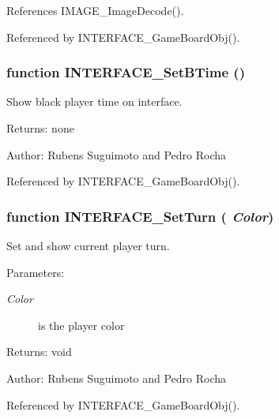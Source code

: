 References IMAGE\_\-ImageDecode().

Referenced by INTERFACE\_\-GameBoardObj().
\subsubsection[INTERFACE\_\-SetBTime]{\setlength{\rightskip}{0pt plus 5cm}function INTERFACE\_\-SetBTime ()}\label{interface_2game_8js_be79ed36e179df4bfd6a3e707bdc5ac9}


Show black player time on interface. 

\begin{Desc}
\item[Returns:]none \end{Desc}
\begin{Desc}
\item[Author:]Rubens Suguimoto and Pedro Rocha \end{Desc}


Referenced by INTERFACE\_\-GameBoardObj().
\subsubsection[INTERFACE\_\-SetTurn]{\setlength{\rightskip}{0pt plus 5cm}function INTERFACE\_\-SetTurn ( {\em Color})}\label{interface_2game_8js_e93e7d2e78640bf855680726a0e43e1f}


Set and show current player turn. 

\begin{Desc}
\item[Parameters:]
\begin{description}
\item[{\em Color}]is the player color \end{description}
\end{Desc}
\begin{Desc}
\item[Returns:]void \end{Desc}
\begin{Desc}
\item[Author:]Rubens Suguimoto and Pedro Rocha \end{Desc}


Referenced by INTERFACE\_\-GameBoardObj().
